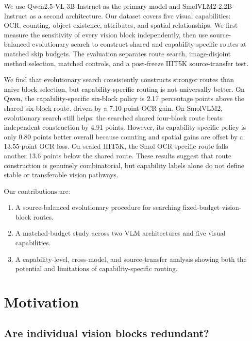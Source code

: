 \documentclass[10pt]{article}
\providecommand{\tightlist}{%
  \setlength{\itemsep}{0pt}\setlength{\parskip}{0pt}}
\begin{document}
We use Qwen2.5-VL-3B-Instruct as the primary model and
SmolVLM2-2.2B-Instruct as a second architecture. Our dataset covers five
visual capabilities: OCR, counting, object existence, attributes, and
spatial relationships. We first measure the sensitivity of every vision
block independently, then use source-balanced evolutionary search to
construct shared and capability-specific routes at matched skip budgets.
The evaluation separates route search, image-disjoint method selection,
matched controls, and a post-freeze IIIT5K source-transfer test.

We find that evolutionary search consistently constructs stronger routes
than naive block selection, but capability-specific routing is not
universally better. On Qwen, the capability-specific six-block policy is
2.17 percentage points above the shared six-block route, driven by a
7.10-point OCR gain. On SmolVLM2, evolutionary search still helps: the
searched shared four-block route beats independent construction by 4.91
points. However, its capability-specific policy is only 0.80 points
better overall because counting and spatial gains are offset by a
13.55-point OCR loss. On sealed IIIT5K, the Smol OCR-specific route
falls another 13.6 points below the shared route. These results suggest
that route construction is genuinely combinatorial, but capability
labels alone do not define stable or transferable vision pathways.

Our contributions are:

\begin{enumerate}
\def\labelenumi{\arabic{enumi}.}
\tightlist
\item
  A source-balanced evolutionary procedure for searching fixed-budget
  vision-block routes.
\item
  A matched-budget study across two VLM architectures and five visual
  capabilities.
\item
  A capability-level, cross-model, and source-transfer analysis showing
  both the potential and limitations of capability-specific routing.
\end{enumerate}

\section{Motivation}\label{motivation}

\subsection{Are individual vision blocks redundant?}\label{are-individual-vision-blocks-redundant}
\end{document}
